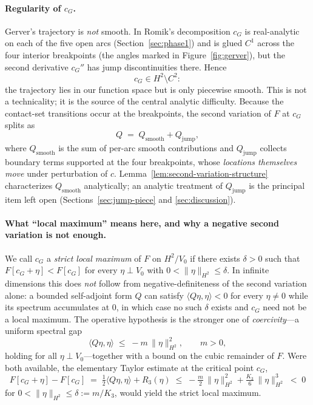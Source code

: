 \documentclass[11pt]{amsart}
\theoremstyle{plain}
\theoremstyle{definition}
\newcommand{\cG}{c_{G}}
\begin{document}
\paragraph{Regularity of $\cG$.}
Gerver's trajectory is \emph{not} smooth.  In Romik's decomposition
$\cG$ is real-analytic on each of the five open arcs
(Section~\ref{sec:phase1}) and is glued $C^{1}$ across the four
interior breakpoints (the angles marked in
Figure~\ref{fig:gerver}), but the second derivative $\cG''$ has jump
discontinuities there.  Hence
\begin{equation}
  \cG \in H^{2} \setminus C^{2}:
\end{equation}
the trajectory lies in our function space but is only piecewise smooth.
This is not a technicality; it is the source of the central analytic
difficulty.  Because the contact-set transitions occur at the
breakpoints, the second variation of $F$ at $\cG$ splits as
\begin{equation}\label{eq:Q-split-intro}
  Q \;=\; Q_{\mathrm{smooth}} + Q_{\mathrm{jump}},
\end{equation}
where $Q_{\mathrm{smooth}}$ is the sum of per-arc smooth contributions
and $Q_{\mathrm{jump}}$ collects boundary terms supported at the four
breakpoints, whose \emph{locations themselves move} under perturbation
of $c$.  Lemma~\ref{lem:second-variation-structure} characterizes
$Q_{\mathrm{smooth}}$ analytically; an analytic treatment of
$Q_{\mathrm{jump}}$ is the principal item left open
(Sections~\ref{sec:jump-piece} and \ref{sec:discussion}).

\paragraph{What ``local maximum'' means here, and why a negative
second variation is not enough.}
We call $\cG$ a \emph{strict local maximum} of $F$ on $H^{2}/V_{0}$ if
there exists $\delta > 0$ such that
$F[\cG + \eta] < F[\cG]$ for every $\eta \perp V_{0}$ with
$0 < \|\eta\|_{H^{2}} \leq \delta$.  In infinite dimensions this does
\emph{not} follow from negative-definiteness of the second variation
alone: a bounded self-adjoint form $Q$ can satisfy
$\langle Q\eta, \eta\rangle < 0$ for every $\eta \neq 0$ while its
spectrum accumulates at $0$, in which case no such $\delta$ exists and
$\cG$ need not be a local maximum.  The operative hypothesis is the
stronger one of \emph{coercivity}---a uniform spectral gap
\begin{equation}\label{eq:coercivity-def}
  \langle Q\eta, \eta\rangle \;\leq\; -m\,\|\eta\|_{H^{2}}^{2},
  \qquad m > 0,
\end{equation}
holding for all $\eta \perp V_{0}$---together with a bound on the cubic
remainder of $F$.  Were both available, the elementary Taylor
estimate at the critical point $\cG$,
\begin{equation}\label{eq:coercivity-implies-max}
  F[\cG + \eta] - F[\cG]
  \;=\; \tfrac12\langle Q\eta, \eta\rangle + R_{3}(\eta)
  \;\leq\; -\tfrac{m}{2}\,\|\eta\|_{H^{2}}^{2}
           + \tfrac{K_{3}}{6}\,\|\eta\|_{H^{2}}^{3}
  \;<\; 0
\end{equation}
for $0 < \|\eta\|_{H^{2}} \leq \delta := m/K_{3}$, would yield the
strict local maximum.
\end{document}
